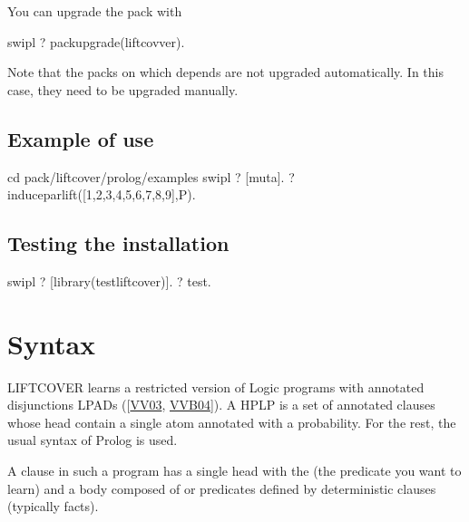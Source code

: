 \documentclass[letterpaper,10pt,english]{sphinxmanual}
\begin{document}
\sphinxAtStartPar
You can upgrade the pack with

\begin{sphinxVerbatim}[commandchars=\\\{\}]
\PYGZdl{} swipl
?\PYGZhy{} pack\PYGZus{}upgrade(liftcovver).
\end{sphinxVerbatim}

\sphinxAtStartPar
Note that the packs on which  depends are not upgraded automatically.
In this case, they need to be upgraded manually.


\section{Example of use}
\label{\detokenize{index:example-of-use}}
\begin{sphinxVerbatim}[commandchars=\\\{\}]
\PYGZdl{} cd \PYGZlt{}pack\PYGZgt{}/liftcover/prolog/examples
\PYGZdl{} swipl
?\PYGZhy{} [muta].
?\PYGZhy{} induce\PYGZus{}par\PYGZus{}lift([1,2,3,4,5,6,7,8,9],P).
\end{sphinxVerbatim}


\section{Testing the installation}
\label{\detokenize{index:testing-the-installation}}
\begin{sphinxVerbatim}[commandchars=\\\{\}]
\PYGZdl{} swipl
?\PYGZhy{} [library(test\PYGZus{}liftcover)].
?\PYGZhy{} test.
\end{sphinxVerbatim}


\chapter{Syntax}
\label{\detokenize{index:syntax}}
\sphinxAtStartPar
LIFTCOVER learns  a restricted version of Logic programs with annotated disjunctions LPADs ({[}\hyperlink{cite.index:id23}{VV03}, \hyperlink{cite.index:id7}{VVB04}{]}). A HPLP is a set of annotated clauses whose head contain a single atom annotated with a probability. For the rest, the usual syntax of Prolog is used.

\sphinxAtStartPar
A clause in such a program has a single head with the  (the predicate you want to learn)
and a body composed of  or predicates defined by deterministic clauses (typically facts).
\end{document}
